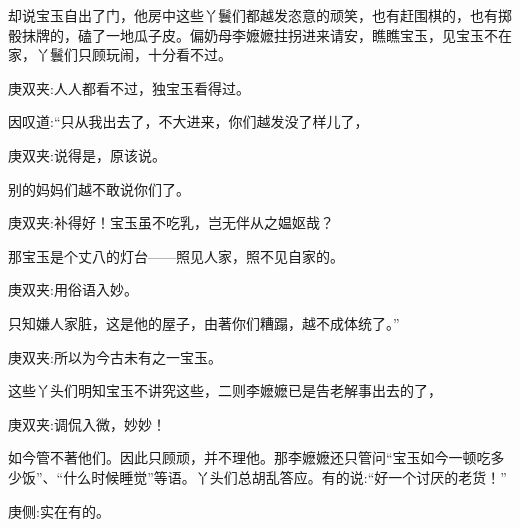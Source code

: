 \begin{parag}
    却说宝玉自出了门，他房中这些丫鬟们都越发恣意的顽笑，也有赶围棋的，也有掷骰抹牌的，磕了一地瓜子皮。偏奶母李嬷嬷拄拐进来请安，瞧瞧宝玉，见宝玉不在家，丫鬟们只顾玩闹，十分看不过。\begin{note}庚双夹:人人都看不过，独宝玉看得过。\end{note}因叹道:“只从我出去了，不大进来，你们越发没了样儿了，\begin{note}庚双夹:说得是，原该说。\end{note}别的妈妈们越不敢说你们了。\begin{note}庚双夹:补得好！宝玉虽不吃乳，岂无伴从之媪妪哉？\end{note}那宝玉是个丈八的灯台——照见人家，照不见自家的。\begin{note}庚双夹:用俗语入妙。\end{note}只知嫌人家脏，这是他的屋子，由著你们糟蹋，越不成体统了。”\begin{note}庚双夹:所以为今古未有之一宝玉。\end{note}这些丫头们明知宝玉不讲究这些，二则李嬷嬷已是告老解事出去的了，\begin{note}庚双夹:调侃入微，妙妙！\end{note}如今管不著他们。因此只顾顽，并不理他。那李嬷嬷还只管问“宝玉如今一顿吃多少饭”、“什么时候睡觉”等语。丫头们总胡乱答应。有的说:“好一个讨厌的老货！”\begin{note}庚侧:实在有的。\end{note}
\end{parag}


